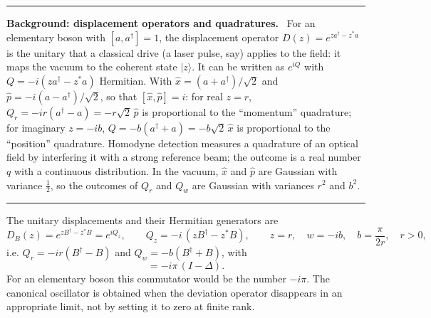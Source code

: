 \documentclass[11pt,a4paper]{article}
\newcommand{\ket}[1]{|#1\rangle}
\newenvironment{background}[1]{\par\medskip\noindent\hrule\smallskip\noindent\textbf{Background: #1.}\ \ignorespaces}{\par\smallskip\noindent\hrule\medskip}
\begin{document}
\begin{background}{displacement operators and quadratures}
For an elementary boson with $[a,a^\dagger]=1$, the displacement operator $D(z)=e^{za^\dagger-z^*a}$ is the unitary that a classical drive (a laser pulse, say) applies to the field: it maps the vacuum to the coherent state $\ket z$. It can be written as $e^{iQ}$ with $Q=-i(za^\dagger-z^*a)$ Hermitian. With $\hat x=(a+a^\dagger)/\sqrt2$ and $\hat p=-i(a-a^\dagger)/\sqrt2$, so that $[\hat x,\hat p]=i$: for real $z=r$, $Q_r=-ir(a^\dagger-a)=-r\sqrt2\,\hat p$ is proportional to the ``momentum'' quadrature; for imaginary $z=-ib$, $Q=-b(a^\dagger+a)=-b\sqrt2\,\hat x$ is proportional to the ``position'' quadrature. Homodyne detection measures a quadrature of an optical field by interfering it with a strong reference beam; the outcome is a real number $q$ with a continuous distribution. In the vacuum, $\hat x$ and $\hat p$ are Gaussian with variance $\tfrac12$, so the outcomes of $Q_r$ and $Q_w$ are Gaussian with variances $r^2$ and $b^2$.
\end{background}

The unitary displacements and their Hermitian generators are
\begin{equation}
D_B(z)=e^{zB^\dagger-z^*B}=e^{iQ_z},\qquad Q_z=-i\,(zB^\dagger-z^*B),\qquad z=r,\quad w=-ib,\quad b=\frac{\pi}{2r},\quad r>0,
\label{eq:disp}
\end{equation}
i.e. $Q_r=-ir(B^\dagger-B)$ and $Q_w=-b(B^\dagger+B)$, with
\begin{equation}
[Q_r,Q_w]=-i\pi\,(I-\Delta).
\end{equation}
For an elementary boson this commutator would be the number $-i\pi$. The canonical oscillator is obtained when the deviation operator disappears in an appropriate limit, not by setting it to zero at finite rank.
\end{document}

